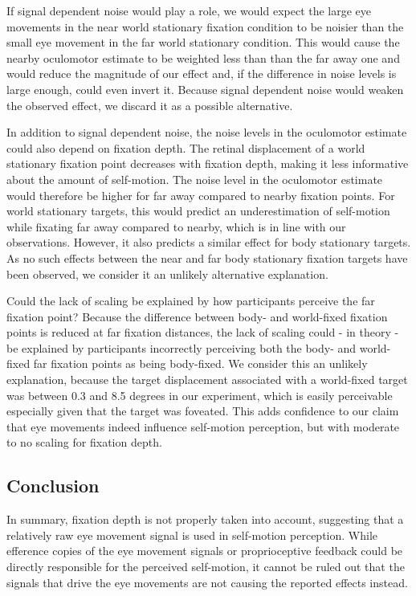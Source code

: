  If signal dependent noise would play a role, we would expect the large eye movements in the near world stationary fixation condition to be noisier than the small eye movement in the far world stationary condition. This would cause the nearby oculomotor estimate to be weighted less than than the far away one and would reduce the magnitude of our effect and, if the difference in noise levels is large enough, could even invert it. Because signal dependent noise would  weaken the observed effect, we discard it as a possible alternative.
 
 In addition to signal dependent noise, the noise levels in the oculomotor estimate could also depend on fixation depth. The retinal displacement of a world stationary fixation point decreases with fixation depth, making it less informative about the amount of self-motion. The noise level in the oculomotor estimate would therefore be higher for far away compared to nearby fixation points. For world stationary targets, this would predict an underestimation of self-motion while fixating far away compared to nearby, which is in line with our observations. However, it also predicts a similar effect for body stationary targets. As no such effects between the near and far body stationary fixation targets have been observed, we consider it an unlikely alternative explanation.

Could the lack of scaling be explained by how participants perceive the far fixation point? Because the difference between body- and world-fixed fixation points is reduced at far fixation distances, the lack of scaling could - in theory - be explained by participants incorrectly perceiving both the body- and world-fixed far fixation points as being body-fixed. We consider this an unlikely explanation, because the target displacement associated with a world-fixed target was between 0.3 and 8.5 degrees in our experiment, which is easily perceivable especially given that the target was foveated. This adds confidence to our claim that eye movements indeed influence self-motion perception, but with moderate to no scaling for fixation depth.

\subsection{Conclusion}
In summary, fixation depth is not properly taken into account, suggesting that a relatively raw eye movement signal is used in self-motion perception. While efference copies of the eye movement signals or proprioceptive feedback could be directly responsible for the perceived self-motion, it cannot be ruled out that the signals that drive the eye movements are not causing the reported effects instead.


